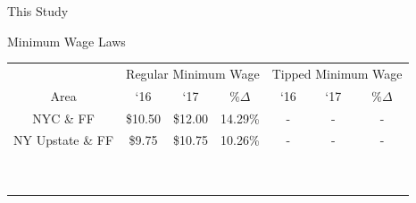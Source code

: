 \documentclass[xcolor=table]{beamer}
\begin{document}
\begin{spacing}{1.2}
\begin{frame}{This Study}
\begin{itemize}
\end{itemize}
\end{frame}



\begin{frame}{Minimum Wage Laws}
\footnotesize
\centering
\begin{tabular}{ c c c c c c c} \\ \hline \hline
&  \multicolumn{3}{c}{Regular Minimum Wage} & \multicolumn{3}{c}{Tipped Minimum Wage}\\
 Area & `16  & `17  & $\% \Delta$ & `16 & `17 &  $\% \Delta$  \\ \hline \hline
 NYC \& FF & \$10.50 & \$12.00 & 14.29\%& - & - & - \\
 NY Upstate \& FF  & \$9.75 & \$10.75 & 10.26\% & - & -& - \\
 \\
 \\
 \\
 \\
 \\
 \\
 \\
 \\
 \\
\end{tabular}
\end{frame}


\end{spacing}
\end{document}

